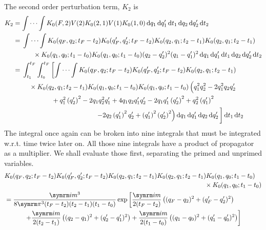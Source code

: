 The second order perturbation term, $K_2$ is
\begin{align}
    K_2 &= \idotsint K_0(F, 2)V(2)K_0(2, 1)V(1)K_0(1, 0)\dd{q_1}\dd{q_1'}\dd{t_1}\dd{q_2}\dd{q_2'}\dd{t_2} \\
    &= \begin{multlined}[t]
        \idotsint K_0(q_F, q_2; t_F - t_2)K_0(q_F', q_2'; t_F - t_2)K_0(q_2, q_1; t_2 - t_1)K_0(q_2, q_1; t_2 - t_1) \\ \times K_0(q_1, q_0; t_1 - t_0)K_0(q_1, q_0; t_1 - t_0)(q_2 - q_2')^2(q_1 - q_1')^2\dd{q_1}\dd{q_1'}\dd{t_1}\dd{q_2}\dd{q_2'}\dd{t_2}
    \end{multlined} \\
    &= \begin{multlined}[t]
        \int_{t_1}^{t_F}\int_{t_0}^{t_F}\left[\idotsint K_0(q_F, q_2; t_F - t_2)K_0(q_F', q_2'; t_F - t_2)K_0(q_2, q_1; t_2 - t_1)\right. \\ \times K_0(q_2, q_1; t_2 - t_1)K_0(q_1, q_0; t_1 - t_0)K_0(q_1, q_0; t_1 - t_0) \left(\vphantom{\left(q_{2}^{\prime}\right)^{2}} q_{1}^{2} q_{2}^{2} - 2 q_{1}^{2} q_{2} q_{2}^{\prime} \right.\\ + q_{1}^{2} \left(q_{2}^{\prime}\right)^{2} - 2 q_{1} q_{2}^{2} q_{1}^{\prime} + 4 q_{1} q_{2} q_{1}^{\prime} q_{2}^{\prime} - 2 q_{1} q_{1}^{\prime} \left(q_{2}^{\prime}\right)^{2} + q_{2}^{2} \left(q_{1}^{\prime}\right)^{2} \\ \left.\left. - 2 q_{2} \left(q_{1}^{\prime}\right)^{2} q_{2}^{\prime} + \left(q_{1}^{\prime}\right)^{2} \left(q_{2}^{\prime}\right)^{2} \right) \dd{q_1}\dd{q_1'}\dd{q_2}\dd{q_2'} \vphantom{\idotsint}\right]\dd{t_1}\dd{t_2}
    \end{multlined}
\end{align}
The integral once again can be broken into nine integrals that must be integrated w.r.t. time twice later on. All those nine integrals have a product of propagator as a multiplier. We shall evaluate those first, separating the primed and unprimed variables.
\begin{align}
    &\begin{multlined}[t]
        K_0(q_F, q_2; t_F - t_2)K_0(q_F', q_2'; t_F - t_2)K_0(q_2, q_1; t_2 - t_1)K_0(q_2, q_1; t_2 - t_1)K_0(q_1, q_0; t_1 - t_0) \\ \times K_0(q_1, q_0; t_1 - t_0)
    \end{multlined} \nonumber \\
    &= \begin{multlined}[t]
        \frac{\im m^3}{8\cpi^3(t_F - t_2)(t_2 - t_1)(t_1 - t_0)}\exp \left[\frac{\im m}{2(t_F - t_2)}\left((q_F - q_2)^2 + (q_F' - q_2')^2\right) \right. \\ \left. + \frac{\im m}{2(t_2 - t_1)}\left((q_2 - q_1)^2 + (q_2' - q_1')^2\right) + \frac{\im m}{2(t_1 - t_0)}\left((q_1 - q_0)^2 + (q_1' - q_0')^2\right)\right]
    \end{multlined}
\end{align}

